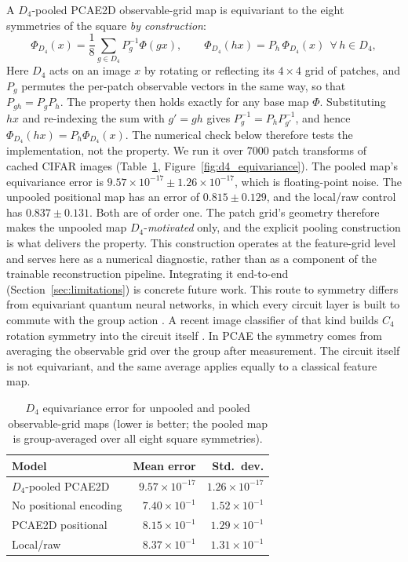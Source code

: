 \documentclass[pdflatex,sn-basic]{sn-jnl}
\begin{document}
A $D_4$-pooled PCAE2D observable-grid map is equivariant to the eight symmetries
of the square \emph{by construction}:
\begin{equation}
  \Phi_{D_4}(x)=\frac{1}{8}\sum_{g\in D_4}P_g^{-1}\Phi(gx),
  \qquad
  \Phi_{D_4}(hx)=P_h\,\Phi_{D_4}(x)\ \ \forall\, h\in D_4,
\end{equation}
Here $D_4$
acts on an image $x$ by rotating or reflecting its $4\times4$ grid of patches,
and $P_g$ permutes the per-patch observable vectors in the same way, so that
$P_{gh}=P_gP_h$. The property then holds exactly for any base map $\Phi$.
Substituting $hx$ and re-indexing the sum with $g'=gh$ gives
$P_g^{-1}=P_hP_{g'}^{-1}$, and hence $\Phi_{D_4}(hx)=P_h\Phi_{D_4}(x)$. The
numerical check below therefore tests the implementation, not the property. We
run it over 7000 patch
transforms of cached CIFAR images (Table~\ref{tab:d4_equivariance},
Figure~\ref{fig:d4_equivariance}). The pooled map's equivariance error is
$9.57\times10^{-17}\pm1.26\times10^{-17}$, which is floating-point noise. The
unpooled positional map has an error of $0.815\pm0.129$, and the local/raw
control has $0.837\pm0.131$. Both are of order one. The patch grid's geometry
therefore makes the unpooled map $D_4$-\emph{motivated} only, and the explicit
pooling construction is what delivers the property. This construction operates
at the feature-grid level and serves here as a numerical diagnostic, rather
than as a component of the trainable reconstruction pipeline. Integrating it
end-to-end (Section~\ref{sec:limitations}) is concrete future work.
This route to symmetry differs from equivariant quantum neural networks,
in which every circuit layer is built to commute with the group action
\citep{Nguyen2024EQNN}. A recent image classifier of that kind builds $C_4$
rotation symmetry into the circuit itself \citep{SanSebastianSein2025}. In PCAE
the symmetry comes from averaging the observable grid over the group after
measurement. The circuit itself is not equivariant, and the same average applies
equally to a classical feature map.

\begin{table}[t]
  \centering
  \caption{$D_4$ equivariance error for unpooled and pooled observable-grid maps
           (lower is better; the pooled map is group-averaged over all eight
           square symmetries).}
  \label{tab:d4_equivariance}
  \begin{tabular}{@{}l r r@{}}
    \toprule
    Model                    & Mean error              & Std.\ dev. \\
    \midrule
    $D_4$-pooled PCAE2D       & $9.57\times10^{-17}$    & $1.26\times10^{-17}$    \\
    No positional encoding   & $7.40\times10^{-1}$     & $1.52\times10^{-1}$     \\
    PCAE2D positional         & $8.15\times10^{-1}$     & $1.29\times10^{-1}$     \\
    Local/raw                & $8.37\times10^{-1}$     & $1.31\times10^{-1}$     \\
    \bottomrule
  \end{tabular}
\end{table}
\end{document}
